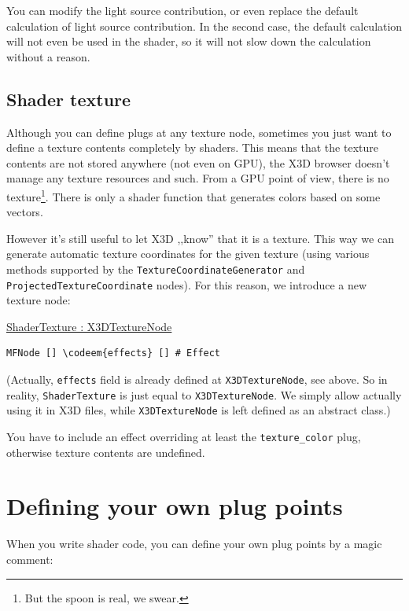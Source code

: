 \documentclass{acmsiggraph}                     %
\newenvironment{mycode}
{\begin{mycodecore}}
{\end{mycodecore}
\vspace{-0.1in}}
\newcommand*{\codeem}[1]{\textbf{#1}}
\begin{document}

You can modify the light source contribution, or even replace the default
calculation of light source contribution. In the second case,
the default calculation will not even be used in the shader,
so it will not slow down the calculation without a reason.

\subsection{Shader texture}

Although you can define plugs at any texture node, sometimes you just
want to define a texture contents completely by shaders. This means
that the texture contents are not stored anywhere (not even on GPU),
the X3D browser doesn't manage any texture resources and such.
From a GPU point of view, there is no texture\footnote{But the spoon is real,
we swear.}. There is only a shader function that generates colors
based on some vectors.

However it's still useful to let X3D ,,know'' that it is a texture.
This way we can generate automatic texture coordinates for the given
texture (using various methods supported by the
\texttt{TextureCoordinateGenerator} and \texttt{ProjectedTextureCoordinate}
nodes). For this reason, we introduce a new texture node:

\begin{mycode}
\underline{ShaderTexture : X3DTextureNode}
\begin{Verbatim}[commandchars=\\\{\}]
MFNode [] \codeem{effects} [] # Effect
\end{Verbatim}
\end{mycode}

(Actually, \texttt{effects} field is already defined at \texttt{X3DTextureNode},
see above. So in reality, \texttt{ShaderTexture} is just equal to
\texttt{X3DTextureNode}. We simply allow actually using it in X3D files,
while \texttt{X3DTextureNode} is left defined as an abstract class.)

You have to include an effect overriding at least the \texttt{texture\_color}
plug, otherwise texture contents are undefined.

\section{Defining your own plug points}

When you write shader code, you can define your own plug points by a
magic comment:
\end{document}

